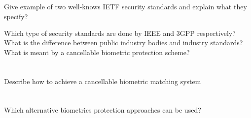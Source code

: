 \begin{questions}
\begin{parts}
  \part{} Give example of two well-knows IETF security standards and explain what they specify?
  \end{parts}

\question{} Which type of security standards are done by IEEE and 3GPP respectively?
\question{} What is the difference between public industry bodies and industry standards?
\question{} What is meant by a cancellable biometric protection scheme?
  \begin{parts}
  \part{} Describe how to achieve a cancellable biometric matching system
  \part{} Which alternative biometrics protection approaches can be used?
  \end{parts}
\end{questions}

